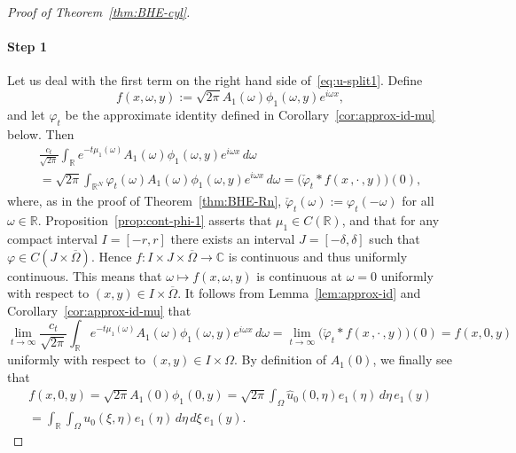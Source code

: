 \documentclass[a4paper, reqno,titlepage]{amsart}
\numberwithin{equation}{section}
\theoremstyle{plain}
\theoremstyle{definition}
\theoremstyle{remark}
\newcommand{\RR}{\mathbb{R}}
\newcommand{\CC}{\mathbb{C}}
\begin{document}
\begin{proof}[Proof of Theorem~\ref{thm:BHE-cyl}]
  \paragraph{Step 1}
  Let us deal with the first term on the right hand side of~\eqref{eq:u-split1}. Define
  \begin{equation*}
    f(x,\omega,y):=\sqrt{2\pi}A_1(\omega)\phi_1(\omega,y)e^{i\omega x},
  \end{equation*}
  and let $\varphi_t$ be the approximate identity defined in Corollary~\ref{cor:approx-id-mu} below. Then
  \begin{multline*}
    \frac{c_t}{\sqrt{2\pi}}\int_{\RR} e^{-t \mu_1(\omega)} A_1(\omega) \phi_1(\omega, y) e^{i\omega x} \,d\omega\\
    =\sqrt{2\pi}\int_{\RR^N}\varphi_t(\omega)A_1(\omega) \phi_1(\omega, y) e^{i\omega x} \,d\omega
    =\bigl(\check\varphi_t*f(x\,,\cdot\,,y)\bigr)(0),
  \end{multline*}
  where, as in the proof of Theorem~\ref{thm:BHE-Rn}, $\check\varphi_t(\omega):=\varphi_t(-\omega)$ for all $\omega\in\RR$.  Proposition~\ref{prop:cont-phi-1} asserts that $\mu_1\in C(\RR)$, and that for any compact interval $I=[-r,r]$ there exists an interval $J = [-\delta,\delta]$ such that $\varphi\in C(J\times\overline{\Omega})$. Hence $f\colon I\times J\times\overline{\Omega} \to \CC$ is continuous and thus uniformly continuous. This means that $\omega\mapsto f(x,\omega,y)$ is continuous at $\omega=0$ uniformly with respect to $(x,y)\in I\times\overline{\Omega}$. It follows from Lemma~\ref{lem:approx-id} and Corollary~\ref{cor:approx-id-mu} that
  \begin{equation*}
    \lim_{t\to\infty}\frac{c_t}{\sqrt{2\pi}}\int_{\RR} e^{-t \mu_1(\omega)} A_1(\omega) \phi_1(\omega, y) e^{i\omega x} \,d\omega
    =\lim_{t\to\infty}\bigl(\check\varphi_t*f(x\,,\cdot\,,y)\bigr)(0)
    =f(x,0,y)
  \end{equation*}
  uniformly with respect to $(x,y)\in I\times\Omega$. By definition of $A_1(0)$, we finally see that
  \begin{multline*}
    f(x,0,y)
    =\sqrt{2\pi}A_1(0)\phi_1(0,y)
    =\sqrt{2\pi}\int_{\Omega}\hat u_0(0,\eta)e_1(\eta)\,d\eta\, e_1(y)\\
    =\int_{\RR}\int_{\Omega}u_0(\xi,\eta)e_1(\eta)\,d\eta\,d\xi\, e_1(y).
  \end{multline*}


\end{proof}
\end{document}
